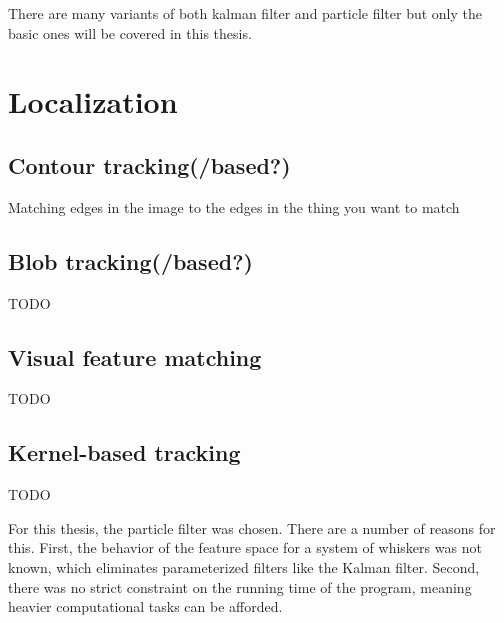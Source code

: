 There are many variants of both kalman filter and particle filter but only the basic ones will be covered in this thesis.

\section{Localization}
\subsection*{Contour tracking(/based?)}
Matching edges in the image to the edges in the thing you want to match

\subsection*{Blob tracking(/based?)}
TODO
\subsection*{Visual feature matching}
TODO
\subsection*{Kernel-based tracking}
TODO


For this thesis, the particle filter was chosen. There are a number of reasons for this. First, the behavior of the feature space for a system of whiskers was not known, which eliminates parameterized filters like the Kalman filter. Second, there was no strict constraint on the running time of the program, meaning heavier computational tasks can be afforded.

